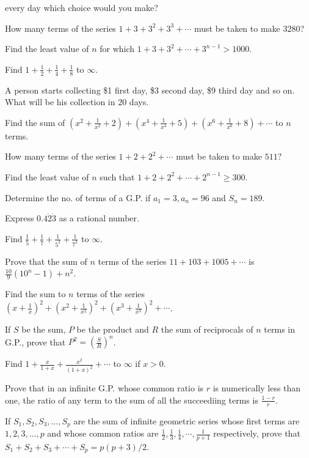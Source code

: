   every day which choice would you make?
\item How many terms of the series $1 + 3 + 3^2 + 3^3 + \cdots$ must be taken to make $3280$?
\item Find the least value of $n$ for which $1 + 3 + 3^2 + \cdots + 3^{n - 1} > 1000$.
\item Find $1 + \frac{1}{2} + \frac{1}{4} + \frac{1}{8}$ to $\infty$.
\item A person starts collecting \$1 first day, \$3 second day, \$9 third day and so on. What will be his collection in $20$
  days.
\item Find the sum of $\left(x^2 + \frac{1}{x^2} + 2\right) + \left(x^4 + \frac{1}{x^4} + 5\right) + \left(x^6 + \frac{1}{x^6} +
  8\right) + \cdots$ to $n$ terms.
\item How many terms of the series $1 + 2 + 2^2 + \cdots$ must be taken to make $511?$
\item Find the least value of $n$ such that $1 + 2 + 2^2 + \cdots + 2^{n - 1} \geq 300$.
\item Determine the no. of terms of a G.P. if $a_1 = 3, a_n = 96$ and $S_n = 189$.
\item Express $0.4\dot{2}\dot{3}$ as a rational number.
\item Find $\frac{1}{5} + \frac{1}{7} + \frac{1}{5^2} + \frac{1}{7^2}$ to $\infty$.
\item Prove that the sum of $n$ terms of the series $11 + 103 + 1005+ \cdots$ is $\frac{10}{9}(10^n - 1) + n^2$.
\item Find the sum to $n$ terms of the series $\left(x + \frac{1}{x}\right)^2 + \left(x^2 + \frac{1}{x^2}\right)^2 + \left(x^3 +
  \frac{1}{x^3}\right)^2 + \cdots$.
\item If $S$ be the sum, $P$ be the product and $R$ the sum of reciprocals of $n$ terms in G.P., prove that $P^2 =
  \left(\frac{S}{R}\right)^n$.
\item Find $1 + \frac{x}{1 + x} + \frac{x^2}{(1 + x)^2} + \cdots$ to $\infty$ if $x > 0$.
\item Prove that in an infinite G.P. whose common ratio is $r$ is numerically less than one, the ratio of any term to the
  sum of all the succeediing terms is $\frac{1 - r}{r}$.
\item If $S_1, S_2, S_3, \ldots, S_p$ are the sum of infinite geometric series whose first terms are $1, 2, 3, \ldots, p$
  and whose common ratios are $\frac{1}{2}, \frac{1}{3}, \frac{1}{4}, \cdots, \frac{1}{p + 1}$ respectively, prove that $S_1 + S_2
  + S_3 + \cdots + S_p = p(p + 3)/2$.
